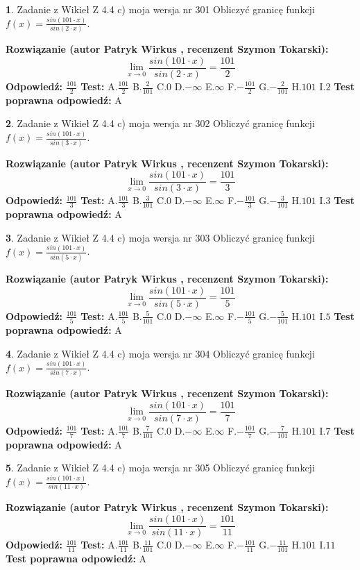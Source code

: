 \documentclass[12pt, a4paper]{article}
\theoremstyle{definition} %
\newtheorem{zad}{}
\newcommand{\zadStart}[1]{\begin{zad}#1\newline}
\newcommand{\zadStop}{\end{zad}}
\newcommand{\rozwStart}[2]{\noindent \textbf{Rozwiązanie (autor #1 , recenzent #2): }\newline}
\newcommand{\rozwStop}{\newline}
\newcommand{\odpStart}{\noindent \textbf{Odpowiedź:}\newline}
\newcommand{\odpStop}{\newline}
\newcommand{\testStart}{\noindent \textbf{Test:}\newline}
\newcommand{\testStop}{\newline}
\newcommand{\kluczStart}{\noindent \textbf{Test poprawna odpowiedź:}\newline}
\newcommand{\kluczStop}{\newline}
\begin{document}
\zadStart{Zadanie z Wikieł Z 4.4 c) moja wersja nr 301}
Obliczyć granicę funkcji $f(x)=\frac{sin(101\cdot x)}{sin(2\cdot x)}$.
\zadStop
\rozwStart{Patryk Wirkus}{Szymon Tokarski}
$$\lim\limits_{x\to 0}\frac{sin(101\cdot x)}{sin(2\cdot x)}=
\frac{101}{2}$$
\rozwStop
\odpStart
$\frac{101}{2}$
\odpStop
\testStart
A.$\frac{101}{2}$
B.$\frac{2}{101}$
C.$0$
D.$-\infty$
E.$\infty$
F.$-\frac{101}{2}$
G.$-\frac{2}{101}$
H.$101$
I.$2$
\testStop
\kluczStart
A
\kluczStop



\zadStart{Zadanie z Wikieł Z 4.4 c) moja wersja nr 302}
Obliczyć granicę funkcji $f(x)=\frac{sin(101\cdot x)}{sin(3\cdot x)}$.
\zadStop
\rozwStart{Patryk Wirkus}{Szymon Tokarski}
$$\lim\limits_{x\to 0}\frac{sin(101\cdot x)}{sin(3\cdot x)}=
\frac{101}{3}$$
\rozwStop
\odpStart
$\frac{101}{3}$
\odpStop
\testStart
A.$\frac{101}{3}$
B.$\frac{3}{101}$
C.$0$
D.$-\infty$
E.$\infty$
F.$-\frac{101}{3}$
G.$-\frac{3}{101}$
H.$101$
I.$3$
\testStop
\kluczStart
A
\kluczStop



\zadStart{Zadanie z Wikieł Z 4.4 c) moja wersja nr 303}
Obliczyć granicę funkcji $f(x)=\frac{sin(101\cdot x)}{sin(5\cdot x)}$.
\zadStop
\rozwStart{Patryk Wirkus}{Szymon Tokarski}
$$\lim\limits_{x\to 0}\frac{sin(101\cdot x)}{sin(5\cdot x)}=
\frac{101}{5}$$
\rozwStop
\odpStart
$\frac{101}{5}$
\odpStop
\testStart
A.$\frac{101}{5}$
B.$\frac{5}{101}$
C.$0$
D.$-\infty$
E.$\infty$
F.$-\frac{101}{5}$
G.$-\frac{5}{101}$
H.$101$
I.$5$
\testStop
\kluczStart
A
\kluczStop



\zadStart{Zadanie z Wikieł Z 4.4 c) moja wersja nr 304}
Obliczyć granicę funkcji $f(x)=\frac{sin(101\cdot x)}{sin(7\cdot x)}$.
\zadStop
\rozwStart{Patryk Wirkus}{Szymon Tokarski}
$$\lim\limits_{x\to 0}\frac{sin(101\cdot x)}{sin(7\cdot x)}=
\frac{101}{7}$$
\rozwStop
\odpStart
$\frac{101}{7}$
\odpStop
\testStart
A.$\frac{101}{7}$
B.$\frac{7}{101}$
C.$0$
D.$-\infty$
E.$\infty$
F.$-\frac{101}{7}$
G.$-\frac{7}{101}$
H.$101$
I.$7$
\testStop
\kluczStart
A
\kluczStop



\zadStart{Zadanie z Wikieł Z 4.4 c) moja wersja nr 305}
Obliczyć granicę funkcji $f(x)=\frac{sin(101\cdot x)}{sin(11\cdot x)}$.
\zadStop
\rozwStart{Patryk Wirkus}{Szymon Tokarski}
$$\lim\limits_{x\to 0}\frac{sin(101\cdot x)}{sin(11\cdot x)}=
\frac{101}{11}$$
\rozwStop
\odpStart
$\frac{101}{11}$
\odpStop
\testStart
A.$\frac{101}{11}$
B.$\frac{11}{101}$
C.$0$
D.$-\infty$
E.$\infty$
F.$-\frac{101}{11}$
G.$-\frac{11}{101}$
H.$101$
I.$11$
\testStop
\kluczStart
A
\kluczStop
\end{document}
